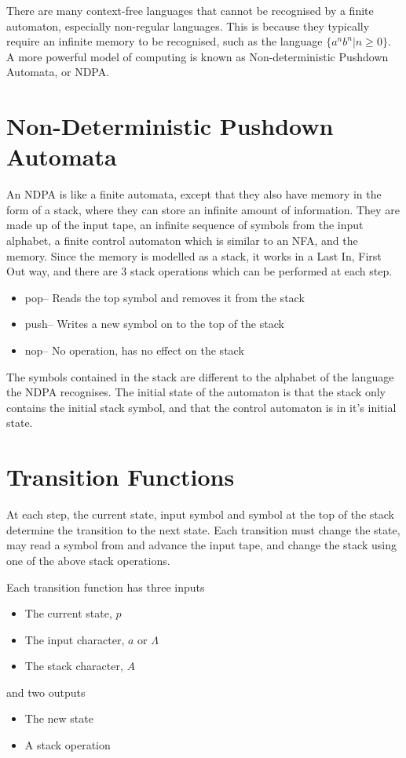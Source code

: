 
There are many context-free languages that cannot be recognised by a finite automaton, especially non-regular languages.
 This is because they typically require an infinite memory to be recognised, such as the language $\{a^n b^n | n \geq 0\}$.
 A more powerful model of computing is known as Non-deterministic Pushdown Automata, or NDPA.

\section*{Non-Deterministic Pushdown Automata}

An NDPA is like a finite automata, except that they also have memory in the form of a stack, where they can store an
 infinite amount of information. They are made up of the input tape, an infinite sequence of symbols from the input
 alphabet, a finite control automaton which is similar to an NFA, and the memory. Since the memory is modelled as a
 stack, it works in a Last In, First Out way, and there are 3 stack operations which can be performed at each step.

\begin{itemize}
  \item pop-- Reads the top symbol and removes it from the stack
  \item push-- Writes a new symbol on to the top of the stack
  \item nop-- No operation, has no effect on the stack
\end{itemize}

The symbols contained in the stack are different to the alphabet of the language the NDPA recognises. The initial state
 of the automaton is that the stack only contains the initial stack symbol, and that the control automaton is in it's
 initial state.

\section*{Transition Functions}

At each step, the current state, input symbol and symbol at the top of the stack determine the transition to the next
 state. Each transition must change the state, may read a symbol from and advance the input tape, and change the stack
 using one of the above stack operations.

Each transition function has three inputs
\begin{itemize}
  \item The current state, $p$
  \item The input character, $a$ or $\Lambda$
  \item The stack character, $A$
\end{itemize}
and two outputs
\begin{itemize}
  \item The new state
  \item A stack operation
\end{itemize}

